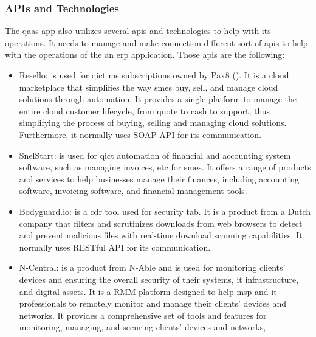 \begin{multicols}{2}
      \subsubsection{APIs and Technologies}
      The \acrshort{qaas} app also utilizes several \acrshort{api}s and technologies to help with its operations.
      It needs to manage and make connection different sort of \acrshort{api}s to help with the operations of the
      an \acrshort{erp} application. Those \acrshort{api}s are the following:
      \begin{itemize}
            \item Resello: is used for \acrshort{qict} \acrshort{ms} subscriptions owned by Pax8 (\textit{\cite{resello}}).
                  It is a cloud marketplace that simplifies the way \acrshort{sme}s buy, sell, and manage cloud solutions
                  through automation. It provides a single platform to manage the entire cloud customer lifecycle, from
                  quote to cash to support, thus simplifying the process of buying, selling and managing cloud
                  solutions. Furthermore, it normally uses \gls{SOAP API} for its communication.
            \item SnelStart: is used for \acrshort{qict} automation of financial and accounting system software,
                  such as managing invoices, \acrshort{etc} for \acrshort{sme}s. It offers a range of products and
                  services to help businesses manage their finances, including accounting software, invoicing software,
                  and financial management tools.
            \item Bodyguard.io: is a \acrshort{cdr} tool used for security tab. It is a product from a Dutch company
                  that filters and scrutinizes downloads from web browsers to detect and prevent malicious files with
                  real-time download scanning capabilities. It normally uses \gls{RESTful API} for its
                  communication.
            \item N-Central: is a product from N-Able and is used for monitoring clients' devices and ensuring the
                  overall security of their systems, \acrshort{it} infrastructure, and digital assets. It is a
                  \gls{RMM} platform designed to help \acrshort{msp} and \acrshort{it} professionals to
                  remotely monitor and manage their clients' devices and networks. It provides a comprehensive
                  set of tools and features for monitoring, managing, and securing clients' devices and networks,

\end{itemize}
\end{multicols}
